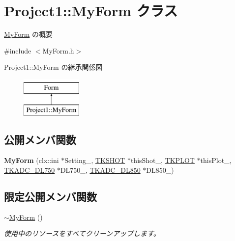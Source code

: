 \hypertarget{class_project1_1_1_my_form}{}\section{Project1\+:\+:My\+Form クラス}
\label{class_project1_1_1_my_form}


\hyperlink{class_project1_1_1_my_form}{My\+Form} の概要  




{\ttfamily \#include $<$My\+Form.\+h$>$}

Project1\+:\+:My\+Form の継承関係図\begin{figure}[H]
\begin{center}
\leavevmode
\includegraphics[height=2.000000cm]{class_project1_1_1_my_form}
\end{center}
\end{figure}
\subsection*{公開メンバ関数}
\begin{DoxyCompactItemize}
\item 
\mbox{\label{class_project1_1_1_my_form_ac122eb20edc58adabec71158eed78a6e}} 
{\bfseries My\+Form} (clx\+::ini $\ast$Setting\+\_\+, \hyperlink{class_t_k_s_h_o_t}{T\+K\+S\+H\+OT} $\ast$this\+Shot\+\_\+, \hyperlink{class_t_k_p_l_o_t}{T\+K\+P\+L\+OT} $\ast$this\+Plot\+\_\+, \hyperlink{class_t_k_a_d_c___d_l750}{T\+K\+A\+D\+C\+\_\+\+D\+L750} $\ast$D\+L750\+\_\+, \hyperlink{class_t_k_a_d_c___d_l850}{T\+K\+A\+D\+C\+\_\+\+D\+L850} $\ast$D\+L850\+\_\+)
\end{DoxyCompactItemize}
\subsection*{限定公開メンバ関数}
\begin{DoxyCompactItemize}
\item 
\hyperlink{class_project1_1_1_my_form_a501b2b4481b72877fc73101f1d6f26be}{$\sim$\+My\+Form} ()
\begin{DoxyCompactList}\small\item\em 使用中のリソースをすべてクリーンアップします。 \end{DoxyCompactList}\end{DoxyCompactItemize}


